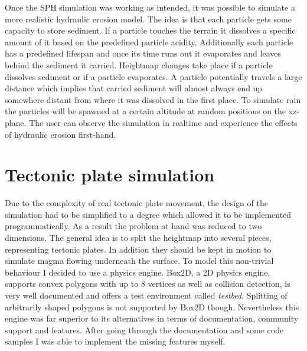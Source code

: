 \documentclass[11pt,a4paper,twoside,openright]{report}
\begin{document}
Once the SPH simulation was working as intended, it was possible to simulate a more realistic hydraulic erosion model. The idea is that each particle gets some capacity to store sediment. If a particle touches the terrain it dissolves a specific amount of it based on the predefined particle acidity. Additionally each particle has a predefined lifespan and once its time runs out it evaporates and leaves behind the sediment it carried. Heightmap changes take place if a particle dissolves sediment or if a particle evaporates. A particle potentially travels a large distance which implies that carried sediment will almost always end up somewhere distant from where it was dissolved in the first place. To simulate rain the particles will be spawned at a certain altitude at random positions on the xz-plane. The user can observe the simulation in realtime and experience the effects of hydraulic erosion first-hand.

\section{Tectonic plate simulation}
\label{sec:tectonicplatesimulation}
Due to the complexity of real tectonic plate movement, the design of the simulation had to be simplified to a degree which allowed it to be implemented programmatically. As a result the problem at hand was reduced to two dimensions. The general idea is to split the heightmap into several pieces, representing tectonic plates. In addition they should be kept in motion to simulate magma flowing underneath the surface. To model this non-trivial behaviour I decided to use a physics engine. Box2D, a 2D physics engine, supports convex polygons with up to 8 vertices as well as collision detection, is very well documented and offers a test environment called \emph{testbed}. Splitting of arbitrarily shaped polygons is not supported by Box2D though. Nevertheless this engine was far superior to its alternatives in terms of documentation, community support and features. After going through the documentation and some code samples I was able to implement the missing features myself.
\end{document}
